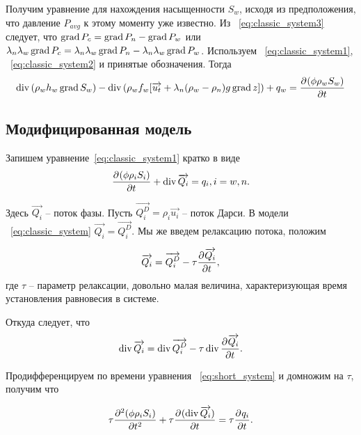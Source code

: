 Получим уравнение для нахождения насыщенности $S_w$, исходя из предположения,
что давление $P_{avg}$ к этому моменту уже известно.
Из ~\eqref{eq:classic_system3} следует, что $\grad{ P_c} = \grad{ P_n} - \grad{ P_w}$ или
$\lambda_n\lambda_w\grad{ P_c} = \lambda_n\lambda_w\grad{ P_n} - \lambda_n\lambda_w\grad{ P_w}$.
Используем ~\eqref{eq:classic_system1}, ~\eqref{eq:classic_system2} и принятые обозначения.
Тогда
\begin{equation} \label{eq:classic_saturation}
  \diver{(\rho_w h_w \grad{ S_w})} - \diver{(\rho_w f_w[\overrightarrow{u_t} + \lambda_n(\rho_w - \rho_n)g \grad{ z}])} + q_w 
  = \pd{(\phi \rho_w S_w)}{t}
\end{equation} 
 
\subsection{Модифицированная модель}

Запишем уравнение~\eqref{eq:classic_system1} кратко в виде
\begin{equation} \label{eq:short_system}
   \pd{(\phi \rho_i S_i)}{t} + \diver{ \overrightarrow{Q_i}} = q_i, i = w,n.
\end{equation}

Здесь $\overrightarrow{Q_i}$ -- поток фазы.
Пусть $\overrightarrow{Q_i^D} = \rho_i \overrightarrow{u_i}$ -- поток Дарси.
В модели ~\eqref{eq:classic_system} $\overrightarrow{Q_i} = \overrightarrow{Q_i^D}$.
Мы же введем релаксацию потока, положим 

\begin{equation}
 \overrightarrow{Q_i} = \overrightarrow{Q_i^D} - \tau \pd{\overrightarrow{Q_i}}{t},
\end{equation}
где $\tau$ -- параметр релаксации, довольно малая величина, характеризующая время установления равновесия в системе.

Откуда следует, что
\begin{equation} \label{eq:div_relax}
 \diver{\overrightarrow{Q_i}} = \diver{\overrightarrow{Q_i^D}} - \tau \diver{\pd{\overrightarrow{Q_i}}{t}}.
\end{equation}

Продифференцируем по времени уравнения ~\eqref{eq:short_system} и домножим на $\tau$, получим что

\begin{equation}
  \tau \pd[2]{(\phi \rho_i S_i)}{t} + \tau \pd{(\diver{ \overrightarrow{Q_i}})}{t} = \tau \pd{q_i}{t}.
\end{equation}

